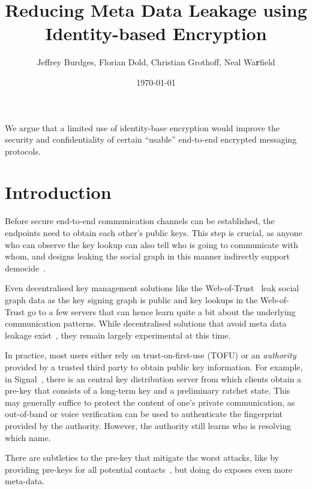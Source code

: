 \documentclass[twoside,letterpaper]{sig-alternate}
\title{Reducing Meta Data Leakage using Identity-based Encryption} %
\author{Jeffrey Burdges, Florian Dold, Christian Grothoff, Neal Wa{\bf r}field}
\date{\today}
\begin{document}
\maketitle


We argue that a limited use of identity-base encryption would improve
the security and confidentiality of certain ``usable'' end-to-end
encrypted messaging protocols.

\section{Introduction}

Before secure end-to-end communication channels can be established,
the endpoints need to obtain each other's public keys.  This step is
crucial, as anyone who can observe the key lookup can also tell who is
going to communicate with whom, and designs leaking the social graph
in this manner indirectly support democide~\cite{skynet}.

Even decentralised key management solutions like the
Web-of-Trust~\cite{wot} leak social graph data as the key signing
graph is public and key lookups in the Web-of-Trust go to a few
servers that can hence learn quite a bit about the underlying
communication patterns.  While decentralised solutions that avoid meta
data leakage exist~\cite{gns}, they remain largely experimental at
this time.

In practice, most users either rely on trust-on-first-use (TOFU) or an
{\em authority} provided by a trusted third party to obtain public key
information.  For example, in Signal~\cite{TextSecure}, there is an
central key distribution server from which clients obtain a pre-key
that consists of a long-term key and a preliminary ratchet state.
This may generally suffice to protect the content of one's private
communication, as out-of-band or voice verification can be used to
authenticate the fingerprint provided by the authority.
However, the authority still learns who is resolving which
name.

There are subtleties to the pre-key that mitigate the worst attacks,
like by providing pre-keys for all potential
contacts~\cite[\S4.3]{TextSecure}, but doing do exposes even more
meta-data.
\end{document}
